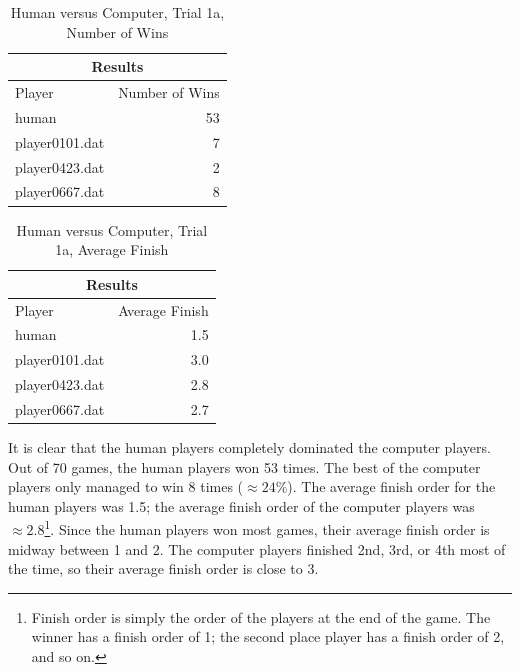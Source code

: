\begin{table}[htbp]
  \centering
  \caption{Human versus Computer, Trial 1a, Number of Wins}
    \begin{tabular}{lr}
    \toprule
    \multicolumn{2}{c}{Results}\\
    \midrule
    Player  & Number of Wins \\
    \midrule
    \multicolumn{1}{l}{human}          & 53 \\
    \multicolumn{1}{l}{player0101.dat} &  7 \\
    \multicolumn{1}{l}{player0423.dat} &  2 \\
    \multicolumn{1}{l}{player0667.dat} &  8 \\
    \bottomrule
    \end{tabular}%
  \label{tab:human_results1a}%
\end{table}%

\begin{table}[htbp]
  \centering
  \caption{Human versus Computer, Trial 1a, Average Finish}
    \begin{tabular}{lr}
    \toprule
    \multicolumn{2}{c}{Results} \\
    \midrule
    Player & Average Finish \\
    \midrule
    \multicolumn{1}{l}{human} & 1.5 \\
    \multicolumn{1}{l}{player0101.dat} & 3.0 \\
    \multicolumn{1}{l}{player0423.dat} & 2.8 \\
    \multicolumn{1}{l}{player0667.dat} & 2.7 \\
    \bottomrule
    \end{tabular}%
  \label{tab:human_results1b}%
\end{table}%

It is clear that the human players completely dominated the computer players.
Out of 70 games, the human players won 53 times. The best of the computer
players only managed to win 8 times (\(\approx24\%\)). The average finish order
for the human players was 1.5; the average finish order of the computer players
was \(\approx2.8\)\footnote{Finish order is simply the order of the players at
the end of the game. The winner has a finish order of 1; the second place player
has a finish order of 2, and so on.}. Since the human players won most games,
their average finish order is midway between 1 and 2. The computer players
finished 2nd, 3rd, or 4th most of the time, so their average finish order is
close to 3.

